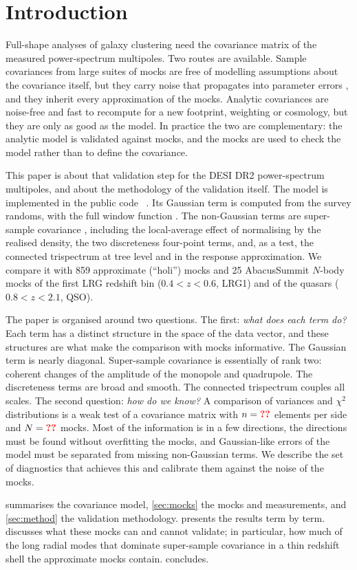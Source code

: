 \section{Introduction}
\label{sec:intro}

Full-shape analyses of galaxy clustering need the covariance matrix of the measured power-spectrum multipoles. Two routes are available. Sample covariances from large suites of mocks are free of modelling assumptions about the covariance itself, but they carry noise that propagates into parameter errors \cite{Hartlap2007,Taylor2013,Dodelson2013,Percival2014}, and they inherit every approximation of the mocks. Analytic covariances are noise-free and fast to recompute for a new footprint, weighting or cosmology, but they are only as good as the model. In practice the two are complementary: the analytic model is validated against mocks, and the mocks are used to check the model rather than to define the covariance.

This paper is about that validation step for the DESI \cite{DESI2016} DR2 power-spectrum multipoles, and about the methodology of the validation itself. The model is implemented in the public code \thecov\ \cite{thecov}. Its Gaussian term is computed from the survey randoms, with the full window function \cite{Grieb2016}. The non-Gaussian terms are super-sample covariance \cite{TakadaHu2013,Li2014}, including the local-average effect of normalising by the realised density, the two discreteness four-point terms, and, as a test, the connected trispectrum at tree level and in the response approximation. We compare it with 859 approximate (``holi'') mocks and 25 AbacusSummit $N$-body mocks \cite{Maksimova2021} of the first LRG redshift bin ($0.4<z<0.6$, LRG1) and of the quasars ($0.8<z<2.1$, QSO).

The paper is organised around two questions. The first: \emph{what does each term do?} Each term has a distinct structure in the space of the data vector, and these structures are what make the comparison with mocks informative. The Gaussian term is nearly diagonal. Super-sample covariance is essentially of rank two: coherent changes of the amplitude of the monopole and quadrupole. The discreteness terms are broad and smooth. The connected trispectrum couples all scales. The second question: \emph{how do we know?} A comparison of variances and $\chi^2$ distributions is a weak test of a covariance matrix with $n=\val{nbins}$ elements per side and $N=\val{Nmocks}$ mocks. Most of the information is in a few directions, the directions must be found without overfitting the mocks, and Gaussian-like errors of the model must be separated from missing non-Gaussian terms. We describe the set of diagnostics that achieves this and calibrate them against the noise of the mocks.

 summarises the covariance model, \cref{sec:mocks} the mocks and measurements, and \cref{sec:method} the validation methodology.  presents the results term by term.  discusses what these mocks can and cannot validate; in particular, how much of the long radial modes that dominate super-sample covariance in a thin redshift shell the approximate mocks contain.  concludes.
